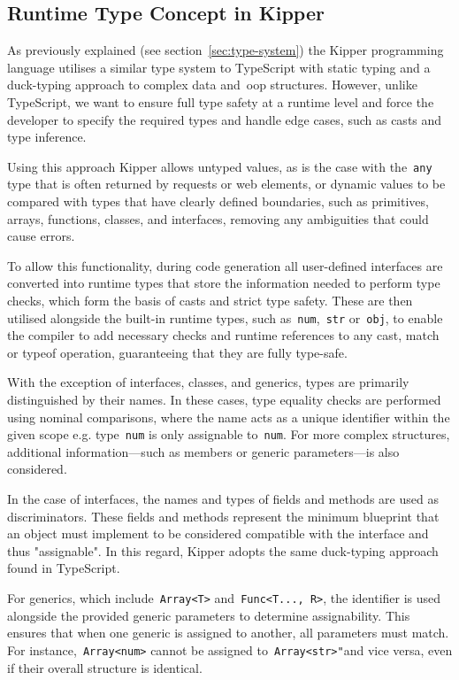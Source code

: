 \subsection{Runtime Type Concept in Kipper}

As previously explained (see section~\ref{sec:type-system}) the Kipper programming language utilises a similar type system to TypeScript with static typing and a duck-typing approach to complex data and~\acrshort{oop} structures. However, unlike TypeScript, we want to ensure full type safety at a runtime level and force the developer to specify the required types and handle edge cases, such as casts and type inference.

Using this approach Kipper allows untyped values, as is the case with the~\lstinline|any| type that is often returned by requests or web elements, or dynamic values to be compared with types that have clearly defined boundaries, such as primitives, arrays, functions, classes, and interfaces, removing any ambiguities that could cause errors.

To allow this functionality, during code generation all user-defined interfaces are converted into runtime types that store the information needed to perform type checks, which form the basis of casts and strict type safety. These are then utilised alongside the built-in runtime types, such as~\lstinline|num|,~\lstinline|str| or~\lstinline|obj|, to enable the compiler to add necessary checks and runtime references to any cast, match or typeof operation, guaranteeing that they are fully type-safe.

With the exception of interfaces, classes, and generics, types are primarily distinguished by their names. In these cases, type equality checks are performed using nominal comparisons, where the name acts as a unique identifier within the given scope e.g. type~\lstinline|num| is only assignable to~\lstinline|num|. For more complex structures, additional information—such as members or generic parameters—is also considered.

In the case of interfaces, the names and types of fields and methods are used as discriminators. These fields and methods represent the minimum blueprint that an object must implement to be considered compatible with the interface and thus "assignable". In this regard, Kipper adopts the same duck-typing approach found in TypeScript.

For generics, which include~\lstinline|Array<T>| and~\lstinline|Func<T..., R>|, the identifier is used alongside the provided generic parameters to determine assignability. This ensures that when one generic is assigned to another, all parameters must match. For instance,~\lstinline|Array<num>| cannot be assigned to~\lstinline|Array<str>"|and vice versa, even if their overall structure is identical.

